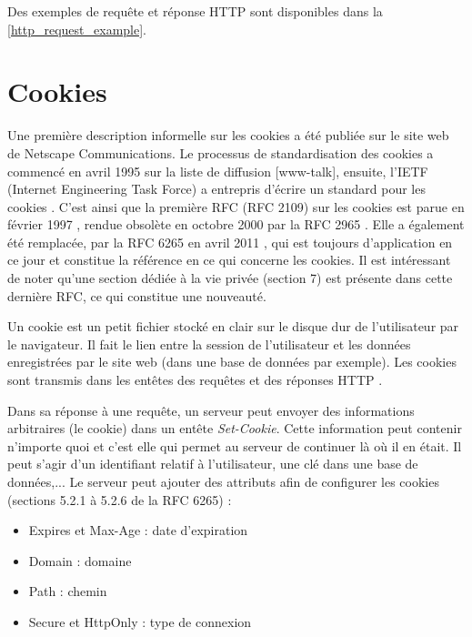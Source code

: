 Des exemples de requête et réponse HTTP sont disponibles dans la \autoref{http_request_example}.


\section{Cookies}
Une première description informelle sur les cookies a été publiée sur le site web de Netscape Communications. Le processus de standardisation des cookies a commencé en avril 1995 sur la liste de diffusion [www-talk], ensuite, l'IETF (Internet Engineering Task Force) a entrepris d'écrire un standard pour les cookies \cite{Kristol:2001:HCS:502152.502153}. C'est ainsi que la première RFC (RFC 2109) sur les cookies est parue en février 1997 \cite{IETF_RFC2109}, rendue obsolète en octobre 2000 par la RFC 2965 \cite{IETF_RFC2965}. Elle a également été remplacée, par la RFC 6265 en avril 2011 \cite{IETF_RFC6265}, qui est toujours d'application en ce jour et constitue la référence en ce qui concerne les cookies. Il est intéressant de noter qu'une section dédiée à la vie privée (section 7) est présente dans cette dernière RFC, ce qui constitue une nouveauté.
\newline

Un cookie est un petit fichier stocké en clair sur le disque dur de l'utilisateur par le navigateur. Il fait le lien entre la session de l'utilisateur et les données enregistrées par le site web (dans une base de données par exemple). Les cookies sont transmis dans les entêtes des requêtes et des réponses HTTP \cite{IETF_RFC6265}.
\newline

Dans sa réponse à une requête, un serveur peut envoyer des informations arbitraires (le cookie) dans un entête \textit{Set-Cookie}. Cette information peut contenir n'importe quoi et c'est elle qui permet au serveur de continuer là où il en était. Il peut s'agir d'un identifiant relatif à l'utilisateur, une clé dans une base de données,...
Le serveur peut ajouter des attributs afin de configurer les cookies (sections 5.2.1 à 5.2.6 de la RFC 6265) \cite{IETF_RFC6265} :

\begin{itemize}
	\item Expires et Max-Age : date d'expiration
	\item Domain : domaine
	\item Path : chemin
	\item Secure et HttpOnly : type de connexion
	\newline
\end{itemize}

